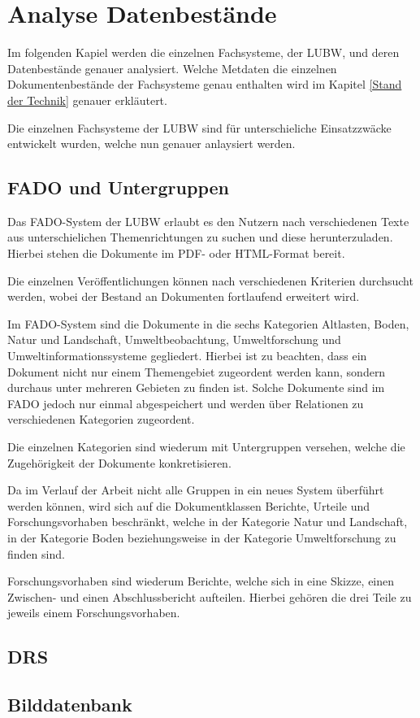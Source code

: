 \section{Analyse Datenbest\"ande} \label{Analyse Datenbestaende}
Im folgenden Kapiel werden die einzelnen Fachsysteme, der \ac{LUBW}, und deren Datenbest\"ande genauer analysiert. Welche Metdaten die einzelnen Dokumentenbest\"ande der Fachsysteme genau enthalten wird im Kapitel \ref{Stand der Technik} genauer erkl\"autert. 

Die einzelnen Fachsysteme der \ac{LUBW} sind f\"ur unterschieliche Einsatzzw\"acke entwickelt wurden, welche nun genauer anlaysiert werden.
\subsection{FADO und Untergruppen} \label{FADO}
Das \ac{FADO}-System der \ac{LUBW} erlaubt es den Nutzern nach verschiedenen Texte aus unterschielichen Themenrichtungen zu suchen und diese herunterzuladen. Hierbei stehen die Dokumente im PDF- oder HTML-Format bereit.

Die einzelnen Ver\"offentlichungen k\"onnen nach verschiedenen Kriterien durchsucht werden, wobei der Bestand an Dokumenten fortlaufend erweitert wird.
\cite{LUBW_FADO}

Im \ac{FADO}-System sind die Dokumente in die sechs Kategorien Altlasten, Boden, Natur und Landschaft, Umweltbeobachtung, Umweltforschung und Umweltinformationssysteme gegliedert. Hierbei ist zu beachten, dass ein Dokument nicht nur einem Themengebiet zugeordent werden kann, sondern durchaus unter mehreren Gebieten zu finden ist. Solche Dokumente sind im \ac{FADO} jedoch nur einmal abgespeichert und werden \"uber Relationen zu verschiedenen Kategorien zugeordent.

Die einzelnen Kategorien sind wiederum mit Untergruppen versehen, welche die Zugeh\"origkeit der Dokumente konkretisieren.

Da im Verlauf der Arbeit nicht alle Gruppen in ein neues System \"uberf\"uhrt werden k\"onnen, wird sich auf die Dokumentklassen Berichte, Urteile und Forschungsvorhaben beschr\"ankt, welche in der Kategorie Natur und Landschaft, in der Kategorie Boden beziehungsweise in der Kategorie Umweltforschung zu finden sind.

Forschungsvorhaben sind wiederum Berichte, welche sich in eine Skizze, einen Zwischen- und einen Abschlussbericht aufteilen. Hierbei geh\"oren die drei Teile zu jeweils einem Forschungsvorhaben.

\subsection{DRS} \label{DRS}
\subsection{Bilddatenbank} \label{Bilddatenbank}
